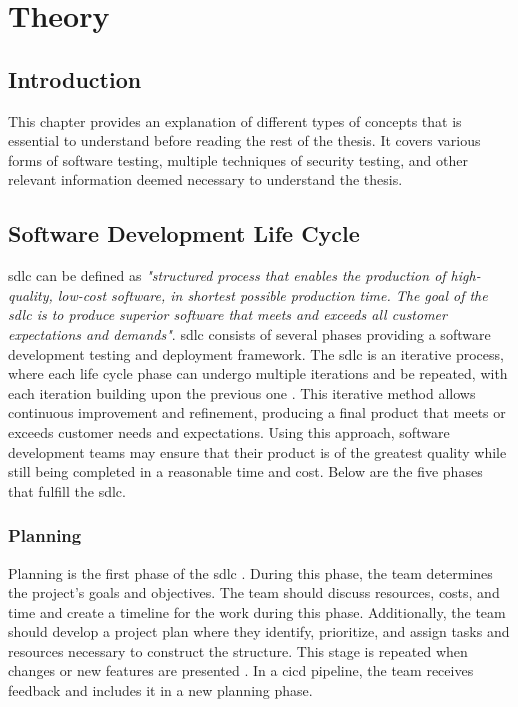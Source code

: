 \newpage
\thispagestyle{empty}
\mbox{}
\chapter{Theory}
\label{chap:Theory}

\section{Introduction}
This chapter provides an explanation of different types of concepts that is essential to understand before reading the rest of the thesis. It covers various forms of software testing, multiple techniques of security testing, and other relevant information deemed necessary to understand the thesis.

\section{Software Development Life Cycle}
\acrlong{sdlc} can be defined as \textit{"structured process that enables the production of high-quality, low-cost software, in shortest possible production time. The goal of the \acrshort{sdlc} is to produce superior software that meets and exceeds all customer expectations and demands"}\cite{sdlc1}. \acrshort{sdlc} consists of several phases providing a software development testing and deployment framework. The \acrlong{sdlc} is an iterative process, where each life cycle phase can undergo multiple iterations and be repeated, with each iteration building upon the previous one \cite{sdlcinterative}. This iterative method allows continuous improvement and refinement, producing a final product that meets or exceeds customer needs and expectations. Using this approach, software development teams may ensure that their product is of the greatest quality while still being completed in a reasonable time and cost. Below are the five phases that fulfill the \acrshort{sdlc}. 

\subsection{Planning} 
Planning is the first phase of the \acrshort{sdlc} \cite{planningphase}. During this phase, the team determines the project's goals and objectives. The team should discuss resources, costs, and time and create a timeline for the work during this phase. Additionally, the team should develop a project plan where they identify, prioritize, and assign tasks and resources necessary to construct the structure. This stage is repeated when changes or new features are presented \cite{PlanningPhaseRepeat}. In a \acrshort{cicd} \gls{pipeline}, the team receives feedback and includes it in a new planning phase.

